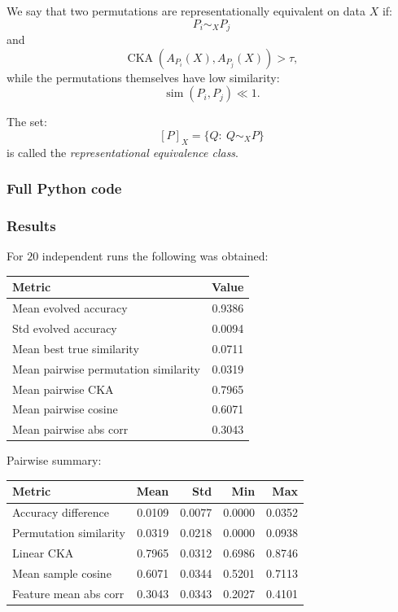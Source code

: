 \documentclass[11pt,a4paper]{report}
\begin{document}
We say that two permutations are representationally equivalent on data $X$ if:
\[
P_i \sim_X P_j
\]
and
\[
\operatorname{CKA}(A_{P_i}(X),A_{P_j}(X)) > \tau,
\]
while the permutations themselves have low similarity:
\[
\operatorname{sim}(P_i,P_j)\ll 1.
\]

The set:
\[
[P]_X = \{Q:\ Q\sim_X P\}
\]
is called the \emph{representational equivalence class}.

\subsubsection{Full Python code}

\noindent{}


\subsubsection{Results}

For $20$ independent runs the following was obtained:

\begin{center}
\begin{tabular}{lr}
\toprule
Metric & Value \\
\midrule
Mean evolved accuracy & 0.9386 \\
Std evolved accuracy & 0.0094 \\
Mean best true similarity & 0.0711 \\
Mean pairwise permutation similarity & 0.0319 \\
Mean pairwise CKA & 0.7965 \\
Mean pairwise cosine & 0.6071 \\
Mean pairwise abs corr & 0.3043 \\
\bottomrule
\end{tabular}
\end{center}

Pairwise summary:

\begin{center}
\begin{tabular}{lrrrr}
\toprule
Metric & Mean & Std & Min & Max \\
\midrule
Accuracy difference & 0.0109 & 0.0077 & 0.0000 & 0.0352 \\
Permutation similarity & 0.0319 & 0.0218 & 0.0000 & 0.0938 \\
Linear CKA & 0.7965 & 0.0312 & 0.6986 & 0.8746 \\
Mean sample cosine & 0.6071 & 0.0344 & 0.5201 & 0.7113 \\
Feature mean abs corr & 0.3043 & 0.0343 & 0.2027 & 0.4101 \\
\bottomrule
\end{tabular}
\end{center}
\end{document}
